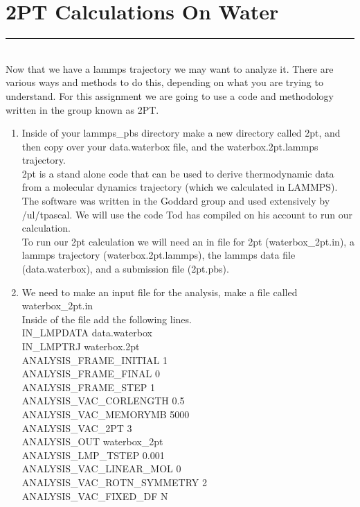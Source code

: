 \documentclass{article}
\begin{document}
\section{2PT Calculations On Water}
\noindent\rule[0.5ex]{\linewidth}{1pt}\\

Now that we have a lammps trajectory we may want to analyze it. 
There are various ways and methods to do this, depending on what you are trying to understand. 
For this assignment we are going to use a code and methodology written in the group known as 2PT. 
\begin{enumerate}
    \item Inside of your lammps\_pbs directory make a new directory called 2pt, and then copy over your data.waterbox file, and the waterbox.2pt.lammps trajectory.\\
2pt is a stand alone code that can be used to derive thermodynamic data from a molecular dynamics trajectory (which we calculated in LAMMPS). 
The software was written in the Goddard group and used extensively by /ul/tpascal.
We will use the code Tod has compiled on his account to run our calculation.\\
To run our 2pt calculation we will need an in file for 2pt (waterbox\_2pt.in), a lammps trajectory (waterbox.2pt.lammps), the lammps data file (data.waterbox), and a submission file (2pt.pbs).

\item We need to make an input file for the analysis, make a file called waterbox\_2pt.in\\
Inside of the file add the following lines. \\
IN\_LMPDATA data.waterbox\\
IN\_LMPTRJ waterbox.2pt\\
ANALYSIS\_FRAME\_INITIAL 1\\
ANALYSIS\_FRAME\_FINAL 0\\
ANALYSIS\_FRAME\_STEP 1\\
ANALYSIS\_VAC\_CORLENGTH 0.5\\
ANALYSIS\_VAC\_MEMORYMB 5000\\
ANALYSIS\_VAC\_2PT 3\\
ANALYSIS\_OUT waterbox\_2pt\\
ANALYSIS\_LMP\_TSTEP 0.001\\
ANALYSIS\_VAC\_LINEAR\_MOL 0\\
ANALYSIS\_VAC\_ROTN\_SYMMETRY 2\\
ANALYSIS\_VAC\_FIXED\_DF N\\


\end{enumerate}
\end{document}
